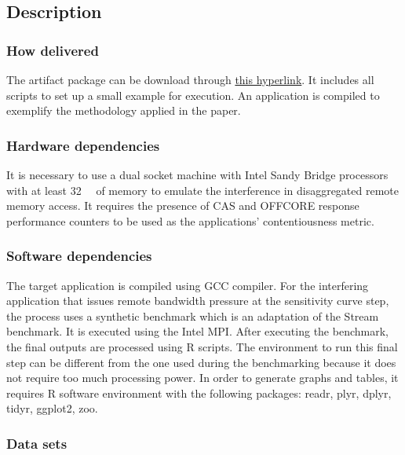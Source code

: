 \documentclass{sigplanconf}
\begin{document}
	\subsection{Description}
	
	\subsubsection{How delivered} 
	
	The artifact package can be download through \href{https://zenodo.org/record/3749250/files/artifact.tar.gz?download=1}{this hyperlink}. It includes all
	scripts to set up a small example for execution. An application is compiled to exemplify
	the methodology applied in the paper. 
	
	\subsubsection{Hardware dependencies} 
	
	It is necessary to use a dual socket machine with Intel Sandy Bridge processors with at
	least \SI{32}{\giga\byte} of memory to emulate the interference in disaggregated remote
	memory access. It requires the presence of CAS and OFFCORE response performance
	counters to be used as the applications' contentiousness metric.  
	
	\subsubsection{Software dependencies} 
	
	The target application is compiled using GCC compiler. For the interfering application
	that issues remote bandwidth pressure at the sensitivity curve step, the process uses a
	synthetic benchmark which is an adaptation of the Stream benchmark. It is executed using
	the Intel MPI. After executing the benchmark, the final outputs are processed using R scripts. The
	environment to run this final step can be different from the one used during the
	benchmarking because it does not require too much processing power. In order to generate
	graphs and tables, it requires R software environment with the following packages: readr,
	plyr, dplyr, tidyr, ggplot2, zoo. 
	
	
	\subsubsection{Data sets}
	
\end{document}
